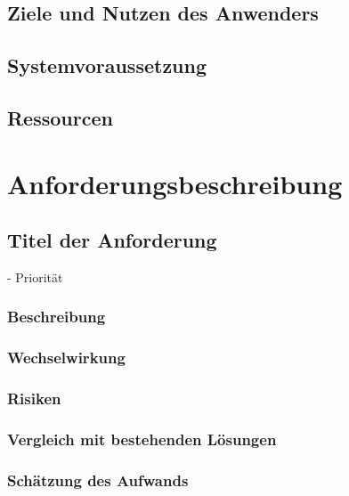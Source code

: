 \documentclass[10pt,a4paper]{article}
\begin{document}
    \subsection{Ziele und Nutzen des Anwenders}
    \subsection{Systemvoraussetzung}
    \subsection{Ressourcen}
    \section{Anforderungsbeschreibung}
    \subsection{Titel der Anforderung}
    - Priorität
    \subsubsection{Beschreibung}
    \subsubsection{Wechselwirkung}
    \subsubsection{Risiken}
    \subsubsection{Vergleich mit bestehenden Lösungen}
    \subsubsection{Schätzung des Aufwands}




\end{document}
